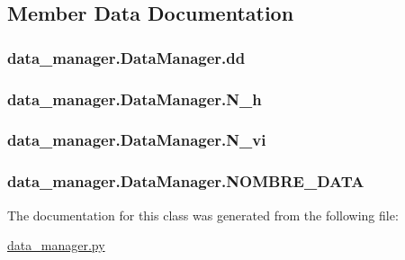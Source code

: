 \subsection{Member Data Documentation}
\hypertarget{classdata__manager_1_1_data_manager_accbcc3f4e324250aa60e83d2b155b6ea}{
\subsubsection[{dd}]{\setlength{\rightskip}{0pt plus 5cm}data\-\_\-manager.\-Data\-Manager.\-dd}}\label{classdata__manager_1_1_data_manager_accbcc3f4e324250aa60e83d2b155b6ea}
\hypertarget{classdata__manager_1_1_data_manager_a4a37984bcecfc9866ee8f16a0c205d6e}{
\subsubsection[{N\-\_\-h}]{\setlength{\rightskip}{0pt plus 5cm}data\-\_\-manager.\-Data\-Manager.\-N\-\_\-h}}\label{classdata__manager_1_1_data_manager_a4a37984bcecfc9866ee8f16a0c205d6e}
\hypertarget{classdata__manager_1_1_data_manager_addad06bf8294cb9e247cfb336402cd5e}{
\subsubsection[{N\-\_\-vi}]{\setlength{\rightskip}{0pt plus 5cm}data\-\_\-manager.\-Data\-Manager.\-N\-\_\-vi}}\label{classdata__manager_1_1_data_manager_addad06bf8294cb9e247cfb336402cd5e}
\hypertarget{classdata__manager_1_1_data_manager_ab9b39124c635d1e7babbb3459288d9d3}{
\subsubsection[{N\-O\-M\-B\-R\-E\-\_\-\-D\-A\-T\-A}]{\setlength{\rightskip}{0pt plus 5cm}data\-\_\-manager.\-Data\-Manager.\-N\-O\-M\-B\-R\-E\-\_\-\-D\-A\-T\-A}}\label{classdata__manager_1_1_data_manager_ab9b39124c635d1e7babbb3459288d9d3}


The documentation for this class was generated from the following file\-:\begin{DoxyCompactItemize}
\item 
\hyperlink{data__manager_8py}{data\-\_\-manager.\-py}\end{DoxyCompactItemize}

